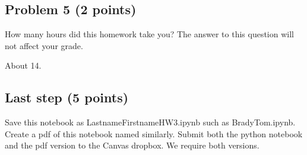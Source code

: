 \documentclass[11pt]{article}
\begin{document}
    \subsection{Problem 5 (2 points)}\label{problem-5-2-points}

How many hours did this homework take you? The answer to this question
will not affect your grade.

    About 14.

    \subsection{Last step (5 points)}\label{last-step-5-points}

Save this notebook as LastnameFirstnameHW3.ipynb such as BradyTom.ipynb.
Create a pdf of this notebook named similarly. Submit both the python
notebook and the pdf version to the Canvas dropbox. We require both
versions.


    
    
    
    
\end{document}
